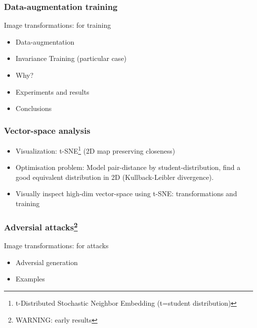 \documentclass[10pt]{beamer}
\begin{document}
\begin{frame}
    \frametitle{Data-augmentation training}
    Image transformations: for training
    \begin{itemize}
        \item Data-augmentation
        \item Invariance Training (particular case)
        \item Why?
        \item Experiments and results
        \item Conclusions
    \end{itemize}
\end{frame}

\begin{frame}
    \frametitle{Vector-space analysis}
    \begin{itemize}
        \item Visualization: t-SNE\footnote{t-Distributed Stochastic Neighbor Embedding (t=student distribution)} (2D map preserving closeness)
        \item Optimisation problem: Model pair-distance by student-distribution, find a good equivalent distribution in 2D (Kullback-Leibler divergence).
        \item Visually inspect high-dim vector-space using t-SNE: transformations and training
    \end{itemize}
\end{frame}

\begin{frame}
    \frametitle{Adversial attacks\footnote{WARNING: early results}}
    Image transformations: for attacks
    \begin{itemize}
        \item Adversial generation
        \item Examples
    \end{itemize}
\end{frame}
\end{document}
